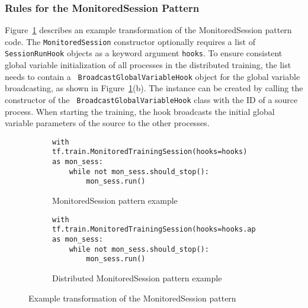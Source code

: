 \subsubsection{Rules for the MonitoredSession Pattern}
Figure~\ref{fig:trans:monsesstrans} describes an example transformation of the
MonitoredSession pattern code.
The {\tt MonitoredSession} constructor optionally requires a list of {\tt
SessionRunHook} objects as a keyword argument {\tt hooks}.
To ensure consistent global variable initialization of all processes in the
distributed training, the list needs to contain a {\tt
BroadcastGlobalVariableHook} object for the global variable broadcasting, as
shown in Figure~\ref{fig:trans:monsesstrans}(b).
The instance can be created by calling the constructor of the {\tt
BroadcastGlobalVariableHook} class with the ID of a source process.  
When starting the training, the hook broadcasts the initial global variable
parameters of the source to the other processes.



\begin{figure}
  \centering
  \begin{subfigure}[t]{0.45\textwidth}
    \begin{lstlisting}[style=mpython]
with tf.train.MonitoredTrainingSession(hooks=hooks) as mon_sess:
    while not mon_sess.should_stop():
        mon_sess.run()\end{lstlisting}
    \caption{MonitoredSession pattern example}
  \end{subfigure}
  \hspace{5mm}
  \begin{subfigure}[t]{0.45\textwidth}
    \begin{lstlisting}[style=mpython]
with tf.train.MonitoredTrainingSession(hooks=hooks.append(hvd.BroadcastGlobalVariablesHook(0)) as mon_sess:
    while not mon_sess.should_stop():
        mon_sess.run()\end{lstlisting}
    \caption{Distributed MonitoredSession pattern example}
  \end{subfigure}
  \caption{Example transformation of the MonitoredSession pattern}
  \label{fig:trans:monsesstrans}
\end{figure}


\vspace{-1em}

